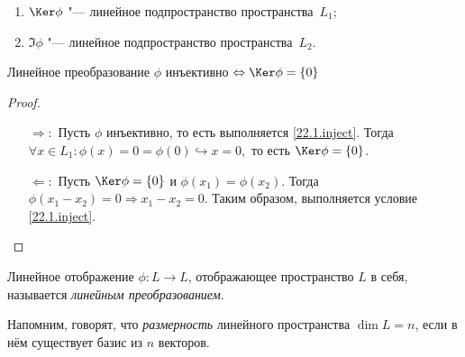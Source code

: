 \begin{stt} 
\begin{enumerate}
\item $\Ker\phi$ "--- линейное подпространство пространства~$L_1$; 
\item $\Im\phi$ "--- линейное подпространство пространства~$L_2$.
\end{enumerate}
\end{stt}
\begin{thm}
Линейное преобразование $\phi$ инъективно $\Leftrightarrow \Ker\phi=\{0\}$
\end{thm}
\begin{proof} $ $
\linebreak\vspace*{-\baselineskip}
\begin{itemize}
\item[\underline{$\Longrightarrow:$}]   Пусть $\phi$ инъективно, то есть выполняется \eqref{22.1.inject}. Тогда \\ $\forall x\in L_1:\phi(x)=0=\phi(0) \hookrightarrow x=0,$ то есть $\Ker\phi=\{0\}$.
\item[\underline{$\Longleftarrow:$}] 
Пусть $\Ker\phi=\{0\}$ и $\phi(x_1)=\phi(x_2)$. Тогда $\phi(x_1-x_2)=0 \Rightarrow x_1-x_2=0$. Таким образом, выполняется условие \eqref{22.1.inject}.
\end{itemize}
\vspace{-1.65\baselineskip}
\end{proof}

\begin{defn}
Линейное отображение $\phi: L\rightarrow L$, отображающее пространство $L$ в себя, называется \textit{линейным преобразованием}.
\end{defn}

Напомним, говорят, что \textit{размерность} линейного пространства $\dim L = n$, если в нём существует базис из $n$ векторов.


